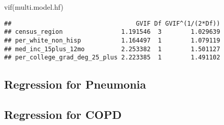 \documentclass[
]{article}
\newenvironment{Shaded}{\begin{snugshade}}{\end{snugshade}}
\newcommand{\CommentTok}[1]{\textcolor[rgb]{0.56,0.35,0.01}{\textit{#1}}}
\newcommand{\DecValTok}[1]{\textcolor[rgb]{0.00,0.00,0.81}{#1}}
\newcommand{\FunctionTok}[1]{\textcolor[rgb]{0.00,0.00,0.00}{#1}}
\newcommand{\NormalTok}[1]{#1}
\newcommand{\OtherTok}[1]{\textcolor[rgb]{0.56,0.35,0.01}{#1}}
\newcommand{\SpecialCharTok}[1]{\textcolor[rgb]{0.00,0.00,0.00}{#1}}
\newcommand{\StringTok}[1]{\textcolor[rgb]{0.31,0.60,0.02}{#1}}
\begin{document}
\begin{Shaded}
\begin{Highlighting}[]
\FunctionTok{vif}\NormalTok{(multi.model.hf)}
\end{Highlighting}
\end{Shaded}

\begin{verbatim}
##                                  GVIF Df GVIF^(1/(2*Df))
## census_region                1.191546  3        1.029639
## per_white_non_hisp           1.164497  1        1.079119
## med_inc_15plus_12mo          2.253382  1        1.501127
## per_college_grad_deg_25_plus 2.223385  1        1.491102
\end{verbatim}

\hypertarget{regression-for-pneumonia}{%
\subsection{Regression for Pneumonia}\label{regression-for-pneumonia}}

\begin{Shaded}
\end{Shaded}

\hypertarget{regression-for-copd}{%
\subsection{Regression for COPD}\label{regression-for-copd}}
\end{document}
